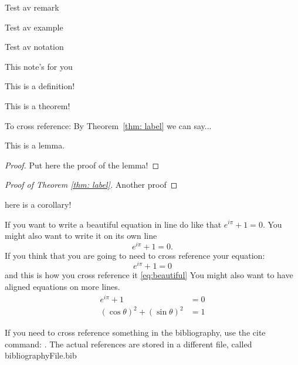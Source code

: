 \begin{remark}
	Test av remark
\end{remark}

\begin{example}
	Test av example
\end{example}

\begin{notation}
	Test av notation
\end{notation}

\begin{note}[Notering]
	This note's for you
\end{note}


\begin{definition}
	This is a definition!
\end{definition}

\begin{theorem}\label{thm: label}
	This is a theorem!
\end{theorem}

To cross reference: By Theorem~\ref{thm: label} we can say...
\begin{lemma}
	This is a lemma.
\end{lemma}
\begin{proof}
	Put here the proof of the lemma!
\end{proof}


\begin{proof}[Proof of Theorem \ref{thm: label}]
	Another proof
\end{proof}


\begin{corollary}
	here is a corollary!
\end{corollary}

If you want to write a beautiful equation in line do like that $e^{i\pi}+1=0$.
You might also want to write it on its own line
\[
e^{i\pi}+1=0.
\]
If you think that you are going to need to cross reference your equation:
\begin{equation}\label{eq:beautiful}
	e^{i\pi}+1=0
\end{equation}
and this is how you cross reference it \eqref{eq:beautiful}
You might also want to have aligned equations on more lines.
\begin{align}
	e^{i\pi}+1&=0\\
	(\cos\theta)^2+(\sin\theta)^2 &=1
\end{align}

If you need to cross reference something in the bibliography, use the cite command: \cite[p. 45]{Biggs2002}. 
The actual references are stored in a different file, called bibliographyFile.bib 

